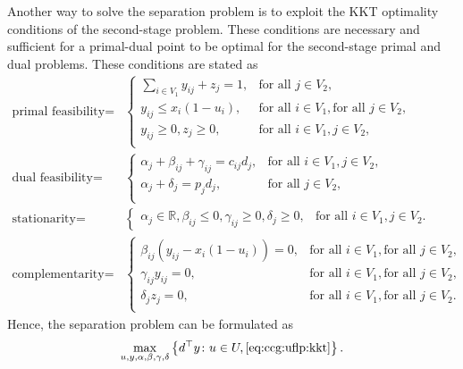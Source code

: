 Another way to solve the separation problem is to exploit the KKT optimality
conditions of the second-stage problem. These conditions are necessary and
sufficient for a primal-dual point to be optimal for the second-stage primal
and dual problems. These conditions are stated as 
\begin{equation}
    \label{eq:ccg:uflp:kkt}
    \begin{aligned}
        \text{primal feasibility} = & 
        \begin{cases}
            \sum_{i\in V_1} y_{ij} + z_j = 1, & \text{for all } j\in V_2, \\
            y_{ij} \le x_i(1 - u_i), & \text{for all } i\in V_1, \text{for all } j\in V_2,  \\
            y_{ij}\ge 0, z_j \ge 0, & \text{for all } i\in V_1, j\in V_2, \\
        \end{cases} \\
        \text{dual feasibility} = & 
        \begin{cases}
            \alpha_j + \beta_{ij} + \gamma_{ij} = c_{ij}d_j, & \text{for all }i\in V_1, j\in V_2, \\
            \alpha_j + \delta_j = p_jd_j, & \text{for all } j\in V_2, \\
        \end{cases} \\
        \text{stationarity} = &
        \begin{cases}
            \alpha_j\in\mathbb{R}, \beta_{ij} \le 0, \gamma_{ij} \ge 0, \delta_j \ge 0, & \text{for all } i\in V_1, j\in V_2.
        \end{cases} \\
        \text{complementarity} = & 
        \begin{cases}
            \beta_{ij}(y_{ij} - x_i(1 - u_i)) = 0, & \text{for all } i\in V_1, \text{for all } j\in V_2, \\
            \gamma_{ij}y_{ij} = 0, & \text{for all } i\in V_1, \text{for all } j\in V_2, \\
            \delta_jz_j = 0, & \text{for all } i\in V_1, \text{for all } j\in V_2. \\
        \end{cases}
    \end{aligned}
\end{equation}
Hence, the separation problem can be formulated as 
\begin{align*}
    \max_{u,y,\alpha,\beta,\gamma,\delta} \left\{ d^\top y \colon u\in U, \eqref{eq:ccg:uflp:kkt} \right\}.
\end{align*}

